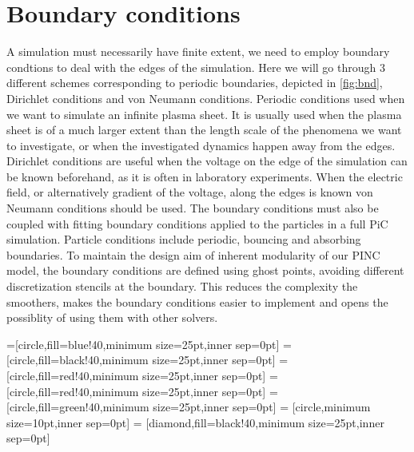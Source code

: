 \section{Boundary conditions}
	\label{sec:bnd_method}
	A simulation must necessarily have finite extent, we need to employ boundary condtions
	to deal with the edges of the simulation. Here we will go through \(3\) different schemes
	corresponding to periodic boundaries, depicted in \cref{fig:bnd}, Dirichlet conditions and von Neumann conditions.
	Periodic conditions  used when we want to simulate an infinite plasma sheet.
	It is usually used when the plasma sheet is of a much larger extent than the
	length scale of the phenomena we want to investigate, or when the investigated
	dynamics happen away from the edges.
	Dirichlet conditions are useful when the voltage on the edge of the simulation
	can be known beforehand, as it is often in laboratory experiments.
	When the electric field, or alternatively gradient of the voltage, along the edges is known
	von Neumann conditions should be used. The boundary conditions must also be coupled
	with fitting boundary conditions applied to the particles in a full PiC simulation.
	Particle conditions include periodic, bouncing and absorbing boundaries.
	To maintain the design aim of inherent modularity of our PINC model, the boundary conditions
	are defined using ghost points, avoiding different discretization stencils at
	the boundary. This reduces the complexity the smoothers, makes the boundary
	conditions easier to implement and opens the possiblity of using them with other
	solvers.

	=[circle,fill=blue!40,minimum size=25pt,inner sep=0pt]
	=[circle,fill=black!40,minimum size=25pt,inner sep=0pt]
	 = [circle,fill=red!40,minimum size=25pt,inner sep=0pt]
	 = [circle,fill=red!40,minimum size=25pt,inner sep=0pt]
	 = [circle,fill=green!40,minimum size=25pt,inner sep=0pt]
	 = [circle,minimum size=10pt,inner sep=0pt]
	 = [diamond,fill=black!40,minimum size=25pt,inner sep=0pt]

